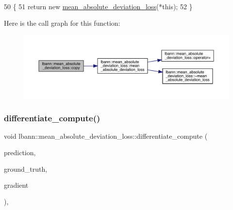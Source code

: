 \begin{DoxyCode}
50                                                       \{
51     \textcolor{keywordflow}{return} \textcolor{keyword}{new} \hyperlink{classlbann_1_1mean__absolute__deviation__loss_ab729227237af711003b6cf4a9d9c9cf1}{mean\_absolute\_deviation\_loss}(*\textcolor{keyword}{this});
52   \}
\end{DoxyCode}
Here is the call graph for this function\+:\nopagebreak
\begin{figure}[H]
\begin{center}
\leavevmode
\includegraphics[width=350pt]{classlbann_1_1mean__absolute__deviation__loss_ad35925ead0532d7893fa9659398ccd45_cgraph}
\end{center}
\end{figure}
\mbox{\label{classlbann_1_1mean__absolute__deviation__loss_a3ed0cbe4e405c10bf3f6a80eb693390e}} 
\subsubsection{\texorpdfstring{differentiate\+\_\+compute()}{differentiate\_compute()}}
{\footnotesize\ttfamily void lbann\+::mean\+\_\+absolute\+\_\+deviation\+\_\+loss\+::differentiate\+\_\+compute (\begin{DoxyParamCaption}\item[{const \hyperlink{base_8hpp_a9a697a504ae84010e7439ffec862b470}{Abs\+Dist\+Mat} \&}]{prediction,  }\item[{const \hyperlink{base_8hpp_a9a697a504ae84010e7439ffec862b470}{Abs\+Dist\+Mat} \&}]{ground\+\_\+truth,  }\item[{\hyperlink{base_8hpp_a9a697a504ae84010e7439ffec862b470}{Abs\+Dist\+Mat} \&}]{gradient }\end{DoxyParamCaption})\hspace{0.3cm}{\ttfamily [override]}, {\ttfamily [virtual]}}

